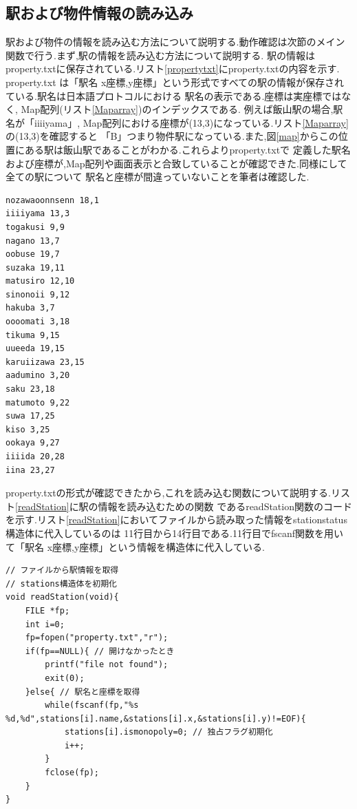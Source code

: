 \documentclass[a4j]{jarticle}
\begin{document}
  \subsection{駅および物件情報の読み込み}
  駅および物件の情報を読み込む方法について説明する.動作確認は次節のメイン関数で行う.まず,駅の情報を読み込む方法について説明する.
  駅の情報はproperty.txtに保存されている.リスト\ref{propertytxt}にproperty.txtの内容を示す. property.txt
  は「駅名 x座標,y座標」という形式ですべての駅の情報が保存されている.駅名は日本語プロトコルにおける
  駅名の表示である.座標は実座標ではなく, Map配列(リスト\ref{Maparray})のインデックスである.
  例えば飯山駅の場合,駅名が「iiiiyama」, Map配列における座標が(13,3)になっている.リスト\ref{Maparray}の(13,3)を確認すると
  「B」つまり物件駅になっている.また,図\ref{map}からこの位置にある駅は飯山駅であることがわかる.これらよりproperty.txtで
  定義した駅名および座標が,Map配列や画面表示と合致していることが確認できた.同様にして全ての駅について
  駅名と座標が間違っていないことを筆者は確認した.
\begin{lstlisting}[basicstyle=\ttfamily\footnotesize, frame=single,label=propertytxt,caption=property.txt]
nozawaoonnsenn 18,1
iiiiyama 13,3
togakusi 9,9
nagano 13,7
oobuse 19,7
suzaka 19,11
matusiro 12,10
sinonoii 9,12
hakuba 3,7
oooomati 3,18
tikuma 9,15
uueeda 19,15
karuiizawa 23,15
aadumino 3,20
saku 23,18
matumoto 9,22
suwa 17,25
kiso 3,25
ookaya 9,27
iiiida 20,28
iina 23,27
        \end{lstlisting}   
    
    property.txtの形式が確認できたから,これを読み込む関数について説明する.リスト\ref{readStation}に駅の情報を読み込むための関数
    であるreadStation関数のコードを示す.リスト\ref{readStation}においてファイルから読み取った情報をstationstatus構造体に代入しているのは
    11行目から14行目である.11行目でfscanf関数を用いて「駅名 x座標,y座標」という情報を構造体に代入している.
\begin{lstlisting}[basicstyle=\ttfamily\footnotesize, frame=single,label=readStation,caption=readStation関数]
// ファイルから駅情報を取得
// stations構造体を初期化
void readStation(void){
    FILE *fp;
    int i=0;
    fp=fopen("property.txt","r");
    if(fp==NULL){ // 開けなかったとき
        printf("file not found");
        exit(0);
    }else{ // 駅名と座標を取得
        while(fscanf(fp,"%s %d,%d",stations[i].name,&stations[i].x,&stations[i].y)!=EOF){
            stations[i].ismonopoly=0; // 独占フラグ初期化
            i++;
        }
        fclose(fp);
    }
}

        \end{lstlisting}     
    
\end{document}
